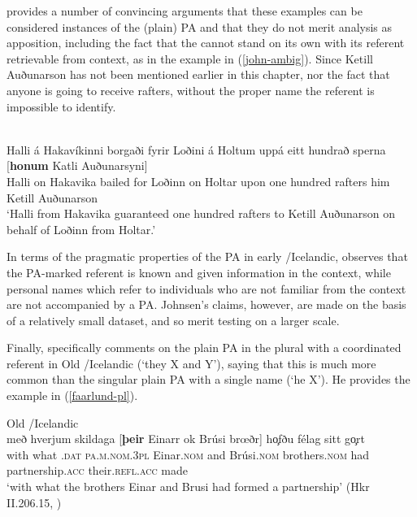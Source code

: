 \documentclass[output=paper,colorlinks,citecolor=brown]{langscibook}
\begin{document}
\citet{Johnsen2016} provides a number of convincing arguments that these examples can be considered instances of the (plain) PA and that they do not merit analysis as apposition, including the fact that the  cannot stand on its own with its referent retrievable from context, as in the example in (\ref{john-ambig}). Since Ketill Auðunarson has not been mentioned earlier in this chapter, nor the fact that anyone is going to receive rafters, without the proper name the referent is impossible to identify.



\ea \label{john-ambig} \\
\gll Halli á Hakavíkinni borgaði fyrir Loðini á Holtum uppá eitt hundrað sperna [\textbf{honum} Katli Auðunarsyni] \\
   Halli on Hakavika bailed for Loðinn on Holtar upon one hundred rafters him Ketill Auðunarson\\
\glt  `Halli from Hakavika guaranteed one hundred rafters to Ketill Auðunarson on behalf of Loðinn from Holtar.' \citep[200]{Johnsen2016}
\z

\noindent In terms of the pragmatic properties of the PA in early /Icelandic, \citet{Johnsen2016} observes that the PA-marked referent is known and given information in the context, while personal names which refer to individuals who are not familiar from the context are not accompanied by a PA. Johnsen's claims, however, are made on the basis of a relatively small dataset, and so merit testing on a larger scale.

Finally, \citet[89]{Faarlund04} specifically comments on the plain PA in the plural with a coordinated referent in Old /Icelandic (`they X and Y'), saying that this is much more common than the singular plain PA with a single name (`he X'). He provides the example in (\ref{faarlund-pl}).

\ea \label{faarlund-pl} Old /Icelandic\\
\gll með hverjum skildaga [\textbf{þeir} Einarr ok Brúsi br{\oe}ðr] h\c{o}fðu félag sitt g\c{o}rt\\
with what .\textsc{dat} \textsc{pa.m.nom.3pl} Einar.\textsc{nom} and Brúsi.\textsc{nom} brothers.\textsc{nom} had partnership.\textsc{acc} their.\textsc{refl.acc} made\\
\glt `with what  the brothers Einar and Brusi had formed a partnership' (Hkr II.206.15, \citealp[89]{Faarlund04})
\z 
\end{document}
